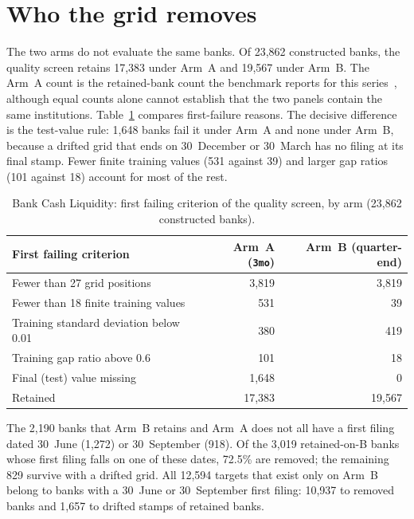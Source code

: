 \documentclass[11pt]{article}
\begin{document}
\section{Who the grid removes}\label{sec:selection}
The two arms do not evaluate the same banks. Of 23,862 constructed banks, the quality screen retains 17,383 under Arm~A and 19,567 under Arm~B. The Arm~A count is the retained-bank count the benchmark reports for this series~\cite{bejarano2026}, although equal counts alone cannot establish that the two panels contain the same institutions. Table~\ref{tab:screen} compares first-failure reasons. The decisive difference is the test-value rule: 1,648 banks fail it under Arm~A and none under Arm~B, because a drifted grid that ends on 30~December or 30~March has no filing at its final stamp. Fewer finite training values (531 against 39) and larger gap ratios (101 against 18) account for most of the rest.

\begin{table}[t]
\centering\small
\caption{Bank Cash Liquidity: first failing criterion of the quality screen, by arm (23,862 constructed banks).}\label{tab:screen}
\begin{tabular}{lrr}
\toprule
First failing criterion & Arm~A (\texttt{3mo}) & Arm~B (quarter-end) \\
\midrule
Fewer than 27 grid positions & 3,819 & 3,819 \\
Fewer than 18 finite training values & 531 & 39 \\
Training standard deviation below 0.01 & 380 & 419 \\
Training gap ratio above 0.6 & 101 & 18 \\
Final (test) value missing & 1,648 & 0 \\
\midrule
Retained & 17,383 & 19,567 \\
\bottomrule
\end{tabular}
\end{table}

The 2,190 banks that Arm~B retains and Arm~A does not all have a first filing dated 30~June (1,272) or 30~September (918). Of the 3,019 retained-on-B banks whose first filing falls on one of these dates, 72.5\% are removed; the remaining 829 survive with a drifted grid. All 12,594 targets that exist only on Arm~B belong to banks with a 30~June or 30~September first filing: 10,937 to removed banks and 1,657 to drifted stamps of retained banks.
\end{document}
